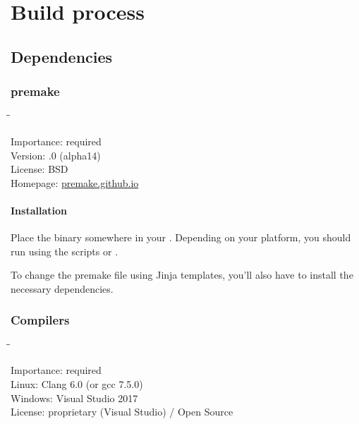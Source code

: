 \chapter{Build process}
\label{chap:build_process}

\section{Dependencies}
\label{sec:dependencies}

\subsection{premake}
\label{sec:dependencies_premake}

\begin{tabbing}
  \hspace*{6em}\=\=\kill

  Importance:  \> required \\
  Version:     .0 (alpha14) \\
  License:     \> BSD \\
  Homepage:    \> \href{https://premake.github.io/}{premake.github.io}
\end{tabbing}

\subsubsection{Installation}

Place the binary somewhere in your .  Depending on your
platform, you should run  using the scripts
 or
.

To change the premake file using Jinja templates, you'll also have to
install the necessary dependencies.

\subsection{Compilers}

\begin{tabbing}
  \hspace*{6em}\=\=\kill

  Importance:  \> required \\
  Linux:       \> Clang 6.0 (or gcc 7.5.0) \\
  Windows:     \> Visual Studio 2017 \\
  License:     \> proprietary (Visual Studio) / Open Source \\
\end{tabbing}


